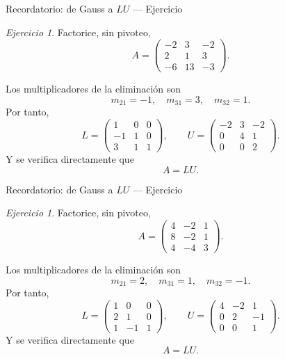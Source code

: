 \documentclass[aspectratio=169,11pt]{beamer}
\theoremstyle{remark}
\newtheorem{Ejer}[definicion]{Ejercicio}
\begin{document}
\begin{frame}[shrink=5]{Recordatorio: de Gauss a $LU$ — Ejercicio}
\footnotesize
\begin{Ejer}
Factorice, sin pivoteo,
\[
A=\begin{pmatrix}-2 & 3 & -2\\2 & 1 & 3\\-6 & 13 & -3\end{pmatrix}.
\]


Los multiplicadores de la eliminación son
\[
m_{21}=-1,\quad m_{31}=3,\quad m_{32}=1.
\]
Por tanto,
\[
L=\begin{pmatrix}1 & 0 & 0\\-1 & 1 & 0\\3 & 1 & 1\end{pmatrix},\qquad U=\begin{pmatrix}-2 & 3 & -2\\0 & 4 & 1\\0 & 0 & 2\end{pmatrix}.
\]
Y se verifica directamente que
\[
\boxed{A=LU}.
\]
\end{Ejer}
\end{frame}

\begin{frame}[shrink=5]{Recordatorio: de Gauss a $LU$ — Ejercicio}
\footnotesize
\begin{Ejer} Factorice, sin pivoteo,
\[
A=\begin{pmatrix}4 & -2 & 1\\8 & -2 & 1\\4 & -4 & 3\end{pmatrix}.
\]

Los multiplicadores de la eliminación son
\[
m_{21}=2,\quad m_{31}=1,\quad m_{32}=-1.
\]
Por tanto,
\[
L=\begin{pmatrix}1 & 0 & 0\\2 & 1 & 0\\1 & -1 & 1\end{pmatrix},\qquad U=\begin{pmatrix}4 & -2 & 1\\0 & 2 & -1\\0 & 0 & 1\end{pmatrix}.
\]
Y se verifica directamente que
\[
\boxed{A=LU}.
\]
\end{Ejer}
\end{frame}
\end{document}
